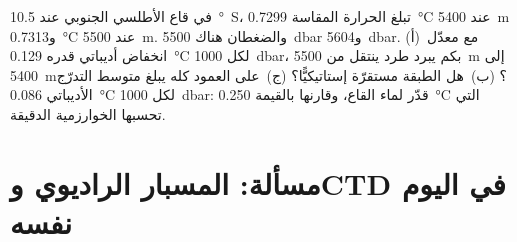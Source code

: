 \begin{exercise}[$\star\star\star$]\label{exo:b1:fluid-envelopes-structure:12}
في قاع الأطلسي الجنوبي عند \qty{10.5}{\degree S}، تبلغ الحرارة المقاسة \qty{0.7299}{\celsius} عند \qty{5400}{m} و\qty{0.7313}{\celsius}
عند \qty{5500}{m}. والضغطان هناك \qty{5500}{dbar} و\qty{5604}{dbar}. (أ)~مع معدّل انخفاض أديباتي قدره \qty{0.129}{\celsius} لكل \qty{1000}{dbar}، بكم يبرد طرد ينتقل من \qty{5500}{m} إلى \qty{5400}{m}؟ (ب)~هل الطبقة مستقرّة إستاتيكيًّا؟ (ج)~على العمود كله يبلغ متوسط التدرّج الأديباتي \qty{0.086}{\celsius} لكل \qty{1000}{dbar}: قدّر  لماء القاع، وقارنها بالقيمة \qty{0.250}{\celsius} التي تحسبها الخوارزمية الدقيقة.
\end{exercise}

\section{مسألة: المسبار الراديوي وCTD في اليوم نفسه}

